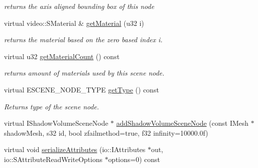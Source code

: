 \begin{DoxyCompactItemize}
\begin{DoxyCompactList}\small\item\em returns the axis aligned bounding box of this node \end{DoxyCompactList}\item 
virtual video\-::\-S\-Material \& \hyperlink{classirr_1_1scene_1_1_c_cube_scene_node_aef58b7e99d8cb70abecea581f71afd9c}{get\-Material} (u32 i)
\begin{DoxyCompactList}\small\item\em returns the material based on the zero based index i. \end{DoxyCompactList}\item 
\hypertarget{classirr_1_1scene_1_1_c_cube_scene_node_aaeda69a1796d3047b488a8b2bf01c313}{virtual u32 \hyperlink{classirr_1_1scene_1_1_c_cube_scene_node_aaeda69a1796d3047b488a8b2bf01c313}{get\-Material\-Count} () const }\label{classirr_1_1scene_1_1_c_cube_scene_node_aaeda69a1796d3047b488a8b2bf01c313}

\begin{DoxyCompactList}\small\item\em returns amount of materials used by this scene node. \end{DoxyCompactList}\item 
\hypertarget{classirr_1_1scene_1_1_c_cube_scene_node_aa7482529b9f8c1ecc61a7941ad920409}{virtual E\-S\-C\-E\-N\-E\-\_\-\-N\-O\-D\-E\-\_\-\-T\-Y\-P\-E \hyperlink{classirr_1_1scene_1_1_c_cube_scene_node_aa7482529b9f8c1ecc61a7941ad920409}{get\-Type} () const }\label{classirr_1_1scene_1_1_c_cube_scene_node_aa7482529b9f8c1ecc61a7941ad920409}

\begin{DoxyCompactList}\small\item\em Returns type of the scene node. \end{DoxyCompactList}\item 
virtual I\-Shadow\-Volume\-Scene\-Node $\ast$ \hyperlink{classirr_1_1scene_1_1_c_cube_scene_node_a61b5075ea4873c0aed6b57cc4c1c8b8e}{add\-Shadow\-Volume\-Scene\-Node} (const I\-Mesh $\ast$shadow\-Mesh, s32 id, bool zfailmethod=true, f32 infinity=10000.\-0f)
\item 
\hypertarget{classirr_1_1scene_1_1_c_cube_scene_node_ae8db14c649acdc443190c874c680ed3a}{virtual void \hyperlink{classirr_1_1scene_1_1_c_cube_scene_node_ae8db14c649acdc443190c874c680ed3a}{serialize\-Attributes} (io\-::\-I\-Attributes $\ast$out, io\-::\-S\-Attribute\-Read\-Write\-Options $\ast$options=0) const }\label{classirr_1_1scene_1_1_c_cube_scene_node_ae8db14c649acdc443190c874c680ed3a}


\end{DoxyCompactItemize}
